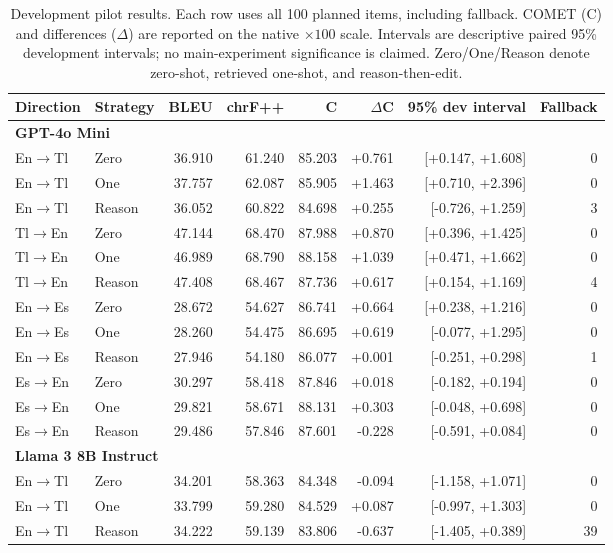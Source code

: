 \begin{table}[t]
\centering\small
\caption{Development pilot results. Each row uses all 100 planned items, including fallback. COMET (C) and differences ($\Delta$) are reported on the native $\times100$ scale. Intervals are descriptive paired 95\% development intervals; no main-experiment significance is claimed. Zero/One/Reason denote zero-shot, retrieved one-shot, and reason-then-edit.}
\label{tab:pilot}
\begin{tabular}{llrrrrrr}
\toprule
Direction & Strategy & BLEU & chrF++ & C & $\Delta$C & 95\% dev interval & Fallback \\
\midrule
\multicolumn{8}{l}{\textbf{GPT-4o Mini}}\\
En$\to$Tl & Zero & 36.910 & 61.240 & 85.203 & +0.761 & [+0.147, +1.608] & 0 \\
En$\to$Tl & One & 37.757 & 62.087 & 85.905 & +1.463 & [+0.710, +2.396] & 0 \\
En$\to$Tl & Reason & 36.052 & 60.822 & 84.698 & +0.255 & [-0.726, +1.259] & 3 \\
Tl$\to$En & Zero & 47.144 & 68.470 & 87.988 & +0.870 & [+0.396, +1.425] & 0 \\
Tl$\to$En & One & 46.989 & 68.790 & 88.158 & +1.039 & [+0.471, +1.662] & 0 \\
Tl$\to$En & Reason & 47.408 & 68.467 & 87.736 & +0.617 & [+0.154, +1.169] & 4 \\
En$\to$Es & Zero & 28.672 & 54.627 & 86.741 & +0.664 & [+0.238, +1.216] & 0 \\
En$\to$Es & One & 28.260 & 54.475 & 86.695 & +0.619 & [-0.077, +1.295] & 0 \\
En$\to$Es & Reason & 27.946 & 54.180 & 86.077 & +0.001 & [-0.251, +0.298] & 1 \\
Es$\to$En & Zero & 30.297 & 58.418 & 87.846 & +0.018 & [-0.182, +0.194] & 0 \\
Es$\to$En & One & 29.821 & 58.671 & 88.131 & +0.303 & [-0.048, +0.698] & 0 \\
Es$\to$En & Reason & 29.486 & 57.846 & 87.601 & -0.228 & [-0.591, +0.084] & 0 \\
\midrule
\multicolumn{8}{l}{\textbf{Llama 3 8B Instruct}}\\
En$\to$Tl & Zero & 34.201 & 58.363 & 84.348 & -0.094 & [-1.158, +1.071] & 0 \\
En$\to$Tl & One & 33.799 & 59.280 & 84.529 & +0.087 & [-0.997, +1.303] & 0 \\
En$\to$Tl & Reason & 34.222 & 59.139 & 83.806 & -0.637 & [-1.405, +0.389] & 39 \\

\end{tabular}
\end{table}
